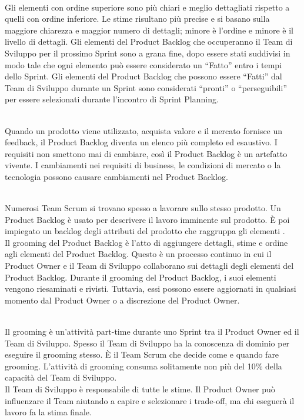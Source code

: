 \\Gli elementi con ordine superiore sono pi\`u chiari e meglio dettagliati rispetto a quelli con ordine inferiore. Le stime 
risultano pi\`u precise e si basano sulla maggiore chiarezza e maggior numero di dettagli; minore è l'ordine e minore \`e il 
livello di dettagli. Gli elementi del Product Backlog che occuperanno il Team di Sviluppo per il prossimo Sprint sono a grana 
fine, dopo essere stati suddivisi in modo tale che ogni elemento pu\`o essere considerato un ``Fatto'' entro i tempi dello 
Sprint. Gli elementi del Product Backlog che possono essere ``Fatti'' dal Team di Sviluppo durante un Sprint sono considerati 
``pronti'' o ``perseguibili'' per essere selezionati durante l'incontro di Sprint Planning. \newline

\\Quando un prodotto viene utilizzato, acquista valore e il mercato fornisce un feedback, il Product Backlog diventa un elenco 
pi\`u completo ed  esaustivo. I requisiti non smettono mai di cambiare, cos\`i il Product Backlog \`e un artefatto vivente. I 
cambiamenti nei requisiti di business, le condizioni di mercato o la tecnologia possono causare cambiamenti nel Product 
Backlog. \newline

\\Numerosi Team Scrum si trovano spesso a lavorare sullo stesso prodotto. Un Product Backlog \`e usato per descrivere il lavoro 
imminente sul prodotto. \`E poi impiegato un backlog degli attributi del prodotto che raggruppa gli elementi .\newline
\\ Il grooming del Product Backlog \`e l'atto di aggiungere dettagli, stime e ordine agli elementi del Product Backlog. Questo 
\`e un processo continuo in cui il Product Owner e il Team di Sviluppo collaborano sui dettagli degli elementi del Product 
Backlog. Durante il grooming del Product Backlog, i suoi elementi vengono riesaminati e rivisti. Tuttavia, essi possono essere 
aggiornati in qualsiasi momento dal Product Owner o a discrezione del Product Owner. \newline

\\Il grooming \`e un'attivit\`a  part-time durante uno Sprint tra il Product Owner ed il Team di Sviluppo. Spesso il Team di 
Sviluppo ha la conoscenza di dominio per eseguire il grooming stesso. \`E il Team Scrum che decide come e quando fare grooming. 
L'attivit\`a di grooming consuma solitamente non pi\`u del 10\% della capacità del Team di Sviluppo. \newline
\\Il Team di Sviluppo \`e responsabile di tutte le stime. Il Product Owner pu\`o influenzare il Team aiutando a capire e 
selezionare i trade-off, ma chi eseguer\`a il lavoro fa la stima finale.

